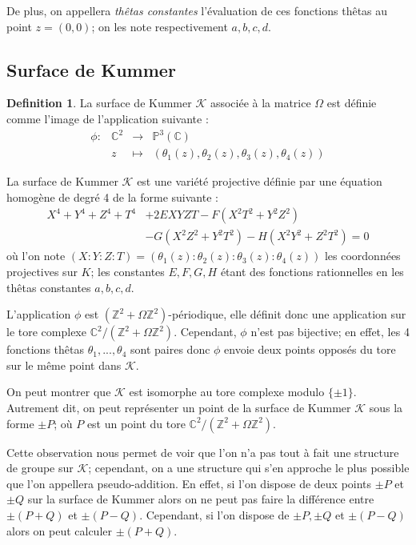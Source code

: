 \documentclass[a4paper]{article}
\theoremstyle{definition}
\newtheorem{definition}{Definition}[section]
\theoremstyle{remark}
\numberwithin{equation}{section}
\begin{document}
De plus, on appellera \emph{thêtas constantes} l'évaluation de ces fonctions thêtas au point $z=(0,0)$; on les note respectivement $a,b,c,d$.

\subsection{Surface de Kummer}

\begin{definition}
La surface de Kummer $\mathcal{K}$ associée à la matrice $\Omega$ est définie comme l'image de l'application suivante :
\begin{equation*}
\begin{array}{lrcl}
\phi :&\mathbb{C}^2 & \longrightarrow & \mathbb{P}^3(\mathbb{C}) \\
& z & \longmapsto & (\theta_1(z),\theta_2(z),\theta_3(z),\theta_4(z))
\end{array}
\end{equation*}
\end{definition}

La surface de Kummer $\mathcal{K}$ est une variété projective définie par une équation homogène de degré 4 de la forme suivante \citep{gaudry} :
\begin{align*}
X^4+Y^4+Z^4+T^4&+2EXYZT-F(X^2T^2+Y^2Z^2) \\
&-G(X^2Z^2+Y^2T^2)-H(X^2Y^2+Z^2T^2)=0
\end{align*}
où l'on note $(X:Y:Z:T)=(\theta_1(z):\theta_2(z):\theta_3(z):\theta_4(z))$ les coordonnées projectives sur $K$; les constantes $E,F,G,H$ étant des fonctions rationnelles en les thêtas constantes $a,b,c,d$.

L'application $\phi$ est $(\mathbb{Z}^2 + \Omega\mathbb{Z}^2)$-périodique, elle définit donc une application sur le tore complexe $\mathbb{C}^2/(\mathbb{Z}^2+\Omega\mathbb{Z}^2)$. Cependant, $\phi$ n'est pas bijective; en effet, les 4 fonctions thêtas $\theta_1,...,\theta_4$ sont paires donc $\phi$ envoie deux points opposés du tore sur le même point dans $\mathcal{K}$.

On peut montrer que $\mathcal{K}$ est isomorphe au tore complexe modulo $\{\pm 1\}$. Autrement dit, on peut représenter un point de la surface de Kummer $\mathcal{K}$ sous la forme $\pm P$; où $P$ est un point du tore $\mathbb{C}^2/(\mathbb{Z}^2+\Omega\mathbb{Z}^2)$.

Cette observation nous permet de voir que l'on n'a pas tout à fait une structure de groupe sur $\mathcal{K}$; cependant, on a une structure qui s'en approche le plus possible que l'on appellera pseudo-addition. En effet, si l'on dispose de deux points $\pm P$ et $\pm Q$ sur la surface de Kummer alors on ne peut pas faire la différence entre $\pm(P+Q)$ et $\pm(P-Q)$. Cependant, si l'on dispose de $\pm P,\pm Q$ et $\pm(P-Q)$ alors on peut calculer $\pm(P+Q)$.
\end{document}
